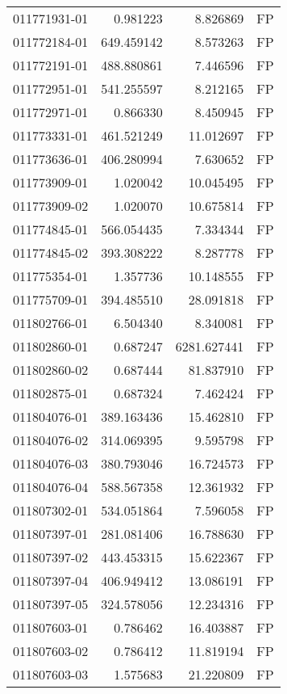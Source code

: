 \begin{tabular}{lrrl}
011771931-01 &    0.981223 &     8.826869 &   FP \\
011772184-01 &  649.459142 &     8.573263 &   FP \\
011772191-01 &  488.880861 &     7.446596 &   FP \\
011772951-01 &  541.255597 &     8.212165 &   FP \\
011772971-01 &    0.866330 &     8.450945 &   FP \\
011773331-01 &  461.521249 &    11.012697 &   FP \\
011773636-01 &  406.280994 &     7.630652 &   FP \\
011773909-01 &    1.020042 &    10.045495 &   FP \\
011773909-02 &    1.020070 &    10.675814 &   FP \\
011774845-01 &  566.054435 &     7.334344 &   FP \\
011774845-02 &  393.308222 &     8.287778 &   FP \\
011775354-01 &    1.357736 &    10.148555 &   FP \\
011775709-01 &  394.485510 &    28.091818 &   FP \\
011802766-01 &    6.504340 &     8.340081 &   FP \\
011802860-01 &    0.687247 &  6281.627441 &   FP \\
011802860-02 &    0.687444 &    81.837910 &   FP \\
011802875-01 &    0.687324 &     7.462424 &   FP \\
011804076-01 &  389.163436 &    15.462810 &   FP \\
011804076-02 &  314.069395 &     9.595798 &   FP \\
011804076-03 &  380.793046 &    16.724573 &   FP \\
011804076-04 &  588.567358 &    12.361932 &   FP \\
011807302-01 &  534.051864 &     7.596058 &   FP \\
011807397-01 &  281.081406 &    16.788630 &   FP \\
011807397-02 &  443.453315 &    15.622367 &   FP \\
011807397-04 &  406.949412 &    13.086191 &   FP \\
011807397-05 &  324.578056 &    12.234316 &   FP \\
011807603-01 &    0.786462 &    16.403887 &   FP \\
011807603-02 &    0.786412 &    11.819194 &   FP \\
011807603-03 &    1.575683 &    21.220809 &   FP \\

\end{tabular}

